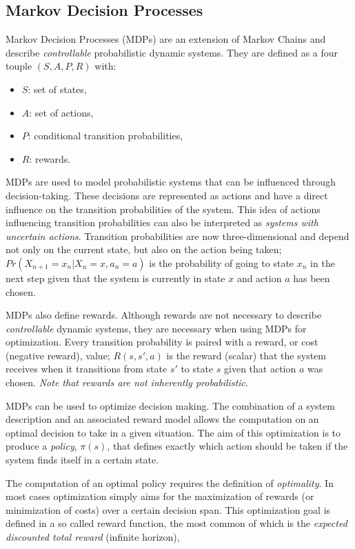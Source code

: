 \subsection{Markov Decision Processes}

Markov Decision Processes (MDPs) are an extension of Markov Chains and describe \textit{controllable} probabilistic dynamic systems. They are defined as a four touple $(S,A,P,R)$ with:
\begin{itemize}
\item $S$: set of states,
\item $A$: set of actions,
\item $P$: conditional transition probabilities,
\item $R$: rewards.
\end{itemize}

MDPs are used to model probabilistic systems that can be influenced through decision-taking. These decisions are represented as actions and have a direct influence on the transition probabilities of the system. This idea of actions influencing transition probabilities can also be interpreted as \textit{systems with uncertain actions}. Transition probabilities are now three-dimensional and depend not only on the current state, but also on the action being taken; $Pr(X_{n+1}=x_n|X_n=x,a_n=a)$ is the probability of going to state $x_n$ in the next step given that the system is currently in state $x$ and action $a$ has been chosen.

MDPs also define rewards. Although rewards are not necessary to describe \textit{controllable} dynamic systems, they are necessary when using MDPs for optimization. Every transition probability is paired with a reward, or cost (negative reward), value; $R(s,s',a)$ is the reward (scalar) that the system receives when it transitions from state $s'$ to state $s$ given that action $a$ was chosen. \textit{Note that rewards are not inherently probabilistic}.

MDPs can be used to optimize decision making. The combination of a system description and an associated reward model allows the computation on an optimal decision to take in a given situation. The aim of this optimization is to produce a \textit{policy}, $\pi(s)$, that defines exactly which action should be taken if the system finds itself in a certain state.

The computation of an optimal policy requires the definition of \textit{optimality}. In most cases optimization simply aims for the maximization of rewards (or minimization of costs) over a certain decision span. This optimization goal is defined in a so called reward function, the most common of which is the \textit{expected discounted total reward} (infinite horizon),

